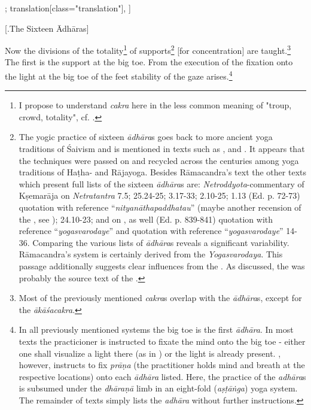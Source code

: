 \begin{alignment}[
  texts=edition[class="edition"];
  translation[class="translation"],
  ]
\begin{edition}
\begin{prose}
\end{prose}
  \end{edition}
  \begin{translation}
    \centerline{\textrm{\small{[.\textsuperscript{}The Sixteen Ādhāras]}}}
    \bigskip
    \begin{tlate}
      \noindent
      Now the divisions of the totality\footnote{I propose to understand \textit{cakra} here in the less common meaning of "troup, crowd, totality", cf. \citeauthor[vol. 2, 1958:209]{petersburger}.} of supports\footnote{The yogic practice of sixteen \textit{ādhāra}s goes back to more ancient yoga traditions of Śaivism and is mentioned in texts such as ,  and . It appears that the techniques were passed on and recycled across the centuries among yoga traditions of Haṭha- and Rājayoga. Besides Rāmacandra's text the other texts which present full lists of the sixteen \textit{ādhāra}s are: \textit{Netroddyota}-commentary of Kṣemarāja on \textit{Netratantra} 7.5;  25.24-25;  3.17-33;  2.10-25;  1.13 (Ed. p. 72-73) quotation with reference ``\textit{nityanāthapaddhatau}'' (maybe another recension of the , see \citeauthor[2023:149]{shivayogapradipika});  24.10-23; and  on , as well  (Ed. p. 839-841) quotation with reference ``\textit{yogasvarodaye}'' and  quotation with reference ``\textit{yogasvarodaye}'' 14-36. Comparing the various lists of \textit{ādhāra}s reveals a significant variability. Rāmacandra's system is certainly derived from the \textit{Yogasvarodaya}. This passage additionally suggests clear influences from the . As \citeauthor[2023:151]{shivayogapradipika} discussed, the  was probably the source text of the .} [for concentration] are taught.\footnote{Most of the previously mentioned \textit{cakra}s overlap with the \textit{ādhāra}s, except for the \textit{ākāśacakra}.}
      The first is the support at the big toe. From the execution of the fixation onto the light at the big toe of the feet stability of the gaze arises.\footnote{In all previously mentioned systems the big toe is the first \textit{ādhāra}. In most texts the practicioner is instructed to fixate the mind onto the big toe - either one shall visualize a light there (as in ) or the light is already present. , however, instructs to fix \textit{prāṇa} (the practitioner holds mind and breath at the respective locations) onto each \textit{ādhāra} listed. Here, the practice of the \textit{adhāra}s is subsumed under the \textit{dhāraṇā} limb in an eight-fold (\textit{aṣṭāṅga}) yoga system. The remainder of texts simply lists the \textit{adhāra} without further instructions.}  

\end{tlate}
\end{translation}
\end{alignment}
